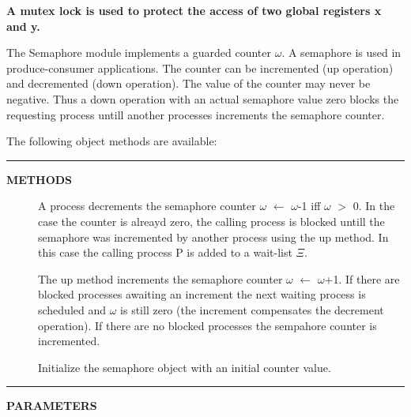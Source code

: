 \documentclass[a4paper,12pt,twoside,english]{article}
\begin{document}
\def\exdescription{\caption{\bf A mutex lock is used to protect the access of two global registers x and y.
}\label{example:8}}
\exampleBplain
\begin{example}[H]\let\normalsize\footnotesize \normalsize
\exdescription
\end{example}
\excontent



\def\thesubsubsection{\tocXLIV}
\secIII{\label{toclabelXLIV}\thesubsubsection}
The Semaphore module implements a guarded counter $\omega$. A semaphore is used in produce-consumer
applications. The counter can be incremented (up operation) and decremented (down operation). The value of the counter may never be negative. Thus a down
operation with an actual semaphore value zero blocks the requesting process untill another processes increments the semaphore counter. 


\vskip5pt
The following object methods are available:


\vskip5pt
\vskip5pt\color{highlight-color}
{\rule[-1pt]{2em}{1em}\hskip15pt\bf METHODS

}
\color{black}

\begin{description}
\item[] $ $\\
A process decrements the semaphore counter $\omega$ $\leftarrow$ $\omega$-1 iff $\omega$ $>$ 0. In the case the counter is alreayd zero, the calling process  is
blocked untill the semaphore was incremented by another process using the up method. In this case the calling process P is added to a wait-list $\Xi$.

\item[] $ $\\
The up method increments the semaphore counter $\omega$ $\leftarrow$ $\omega$+1. If there are blocked processes awaiting an increment the next waiting process
is scheduled and $\omega$ is still zero (the increment compensates the decrement operation). If there are no blocked processes the sempahore counter is
incremented.

\item[] $ $\\
Initialize the semaphore object with an initial counter value.


\end{description}
\vskip5pt\color{highlight-color}
{\rule[-1pt]{2em}{1em}\hskip15pt\bf PARAMETERS

}
\color{black}
\end{document}
